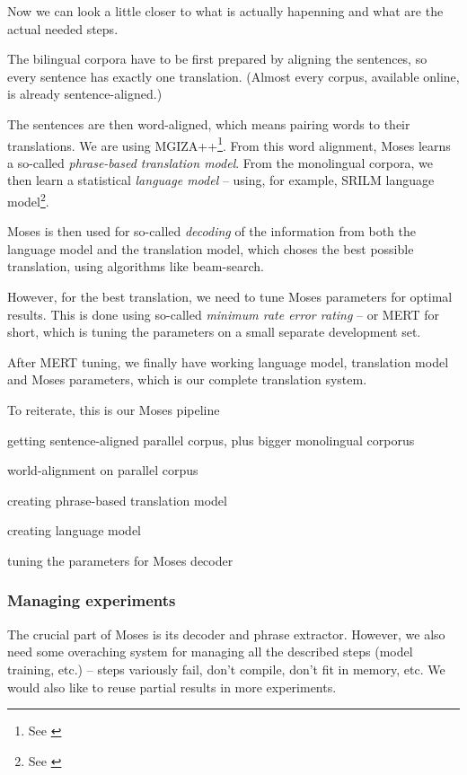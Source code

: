 Now we can look a little closer to what is actually hapenning and what are the actual needed steps.

The bilingual corpora have to be first prepared by aligning the sentences, so every sentence has exactly one translation. (Almost every corpus, available online, is already sentence-aligned.)

The sentences are then word-aligned, which means pairing words to their translations. We are using MGIZA++\footnote{See \cite{mgiza}}. From this word alignment, Moses learns a so-called \emph{phrase-based translation model}. From the monolingual corpora, we then learn a statistical \emph{language model} -- using, for example, SRILM language model\footnote{See \cite{srilm}}.

Moses is then used for so-called \emph{decoding} of the information from both the language model and the translation model, which choses the best possible translation, using algorithms like beam-search.

However, for the best translation, we need to tune Moses parameters for optimal results. This is done using so-called \emph{minimum rate error rating} -- or MERT for short, which is tuning the parameters on a small separate development set.



After MERT tuning, we finally have working language model, translation model and Moses parameters, which is our complete translation system.

To reiterate, this is our Moses pipeline
\begin{pitemize}
\item getting sentence-aligned parallel corpus, plus bigger monolingual corporus
\item world-alignment on parallel corpus
\item creating phrase-based translation model
\item creating language model
\item tuning the parameters for Moses decoder
\end{pitemize}


\subsubsection{Managing experiments}
The crucial part of Moses is its decoder and phrase extractor. However, we also need some overaching system for managing all the described steps (model training, etc.) -- steps variously fail, don't compile, don't fit in memory, etc. We would also like to reuse partial results in more experiments.

